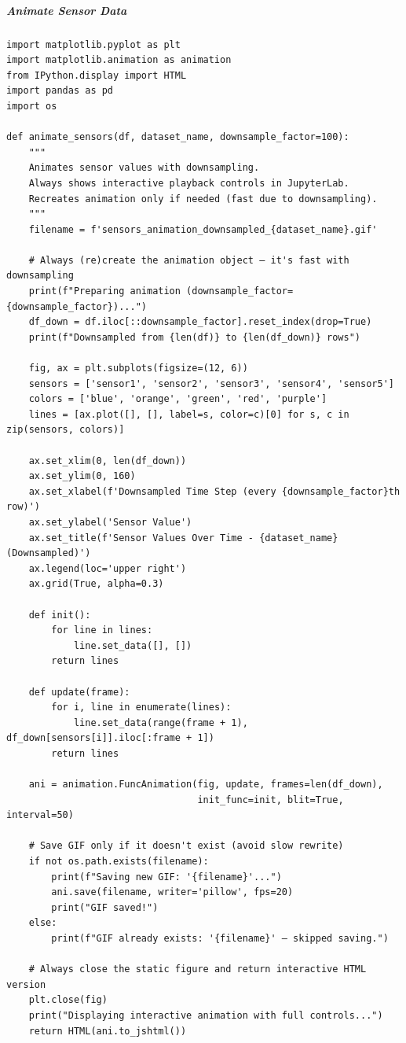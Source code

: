 \subparagraph{Animate Sensor Data}

\begin{verbatim}
import matplotlib.pyplot as plt
import matplotlib.animation as animation
from IPython.display import HTML
import pandas as pd
import os

def animate_sensors(df, dataset_name, downsample_factor=100):
    """
    Animates sensor values with downsampling.
    Always shows interactive playback controls in JupyterLab.
    Recreates animation only if needed (fast due to downsampling).
    """
    filename = f'sensors_animation_downsampled_{dataset_name}.gif'
    
    # Always (re)create the animation object — it's fast with downsampling
    print(f"Preparing animation (downsample_factor={downsample_factor})...")
    df_down = df.iloc[::downsample_factor].reset_index(drop=True)
    print(f"Downsampled from {len(df)} to {len(df_down)} rows")
    
    fig, ax = plt.subplots(figsize=(12, 6))
    sensors = ['sensor1', 'sensor2', 'sensor3', 'sensor4', 'sensor5']
    colors = ['blue', 'orange', 'green', 'red', 'purple']
    lines = [ax.plot([], [], label=s, color=c)[0] for s, c in zip(sensors, colors)]
    
    ax.set_xlim(0, len(df_down))
    ax.set_ylim(0, 160)
    ax.set_xlabel(f'Downsampled Time Step (every {downsample_factor}th row)')
    ax.set_ylabel('Sensor Value')
    ax.set_title(f'Sensor Values Over Time - {dataset_name} (Downsampled)')
    ax.legend(loc='upper right')
    ax.grid(True, alpha=0.3)
    
    def init():
        for line in lines:
            line.set_data([], [])
        return lines
    
    def update(frame):
        for i, line in enumerate(lines):
            line.set_data(range(frame + 1), df_down[sensors[i]].iloc[:frame + 1])
        return lines
    
    ani = animation.FuncAnimation(fig, update, frames=len(df_down),
                                  init_func=init, blit=True, interval=50)
    
    # Save GIF only if it doesn't exist (avoid slow rewrite)
    if not os.path.exists(filename):
        print(f"Saving new GIF: '{filename}'...")
        ani.save(filename, writer='pillow', fps=20)
        print("GIF saved!")
    else:
        print(f"GIF already exists: '{filename}' — skipped saving.")
    
    # Always close the static figure and return interactive HTML version
    plt.close(fig)
    print("Displaying interactive animation with full controls...")
    return HTML(ani.to_jshtml())
\end{verbatim}

